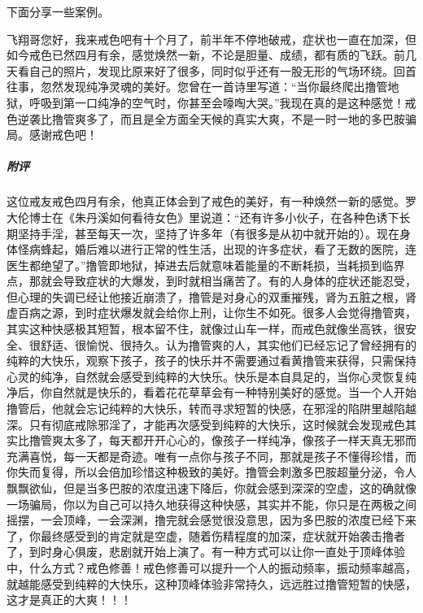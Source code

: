 下面分享一些案例。

\begin{case}
    飞翔哥您好，我来戒色吧有十个月了，前半年不停地破戒，症状也一直在加深，但如今戒色已然四月有余，感觉焕然一新，不论是胆量、成绩，都有质的飞跃。前几天看自己的照片，发现比原来好了很多，同时似乎还有一股无形的气场环绕。回首往事，忽然发现纯净灵魂的美好。您曾在一首诗里写道：“当你最终爬出撸管地狱，呼吸到第一口纯净的空气时，你甚至会嚎啕大哭。”我现在真的是这种感觉！戒色逆袭比撸管爽多了，而且是全方面全天候的真实大爽，不是一时一地的多巴胺骗局。感谢戒色吧！
    \subparagraph{附评} 这位戒友戒色四月有余，他真正体会到了戒色的美好，有一种焕然一新的感觉。罗大伦博士在《朱丹溪如何看待女色》里说道：“还有许多小伙子，在各种色诱下长期坚持手淫，甚至每天一次，坚持了许多年（有很多是从初中就开始的）。现在身体怪病蜂起，婚后难以进行正常的性生活，出现的许多症状，看了无数的医院，连医生都绝望了。”撸管即地狱，掉进去后就意味着能量的不断耗损，当耗损到临界点，那就会导致症状的大爆发，到时就相当痛苦了。有的人身体的症状还能忍受，但心理的失调已经让他接近崩溃了，撸管是对身心的双重摧残，肾为五脏之根，肾虚百病之源，到时症状爆发就会给你上刑，让你生不如死。很多人会觉得撸管爽，其实这种快感极其短暂，根本留不住，就像过山车一样，而戒色就像坐高铁，很安全、很舒适、很愉悦、很持久。认为撸管爽的人，其实他们已经忘记了曾经拥有的纯粹的大快乐，观察下孩子，孩子的快乐并不需要通过看黄撸管来获得，只需保持心灵的纯净，自然就会感受到纯粹的大快乐。快乐是本自具足的，当你心灵恢复纯净后，你自然就是快乐的，看着花花草草会有一种特别美好的感觉。当一个人开始撸管后，他就会忘记纯粹的大快乐，转而寻求短暂的快感，在邪淫的陷阱里越陷越深。只有彻底戒除邪淫了，才能再次感受到纯粹的大快乐，这时候就会发现戒色其实比撸管爽太多了，每天都开开心心的，像孩子一样纯净，像孩子一样天真无邪而充满喜悦，每一天都是奇迹。唯有一点你与孩子不同，那就是孩子不懂得珍惜，而你失而复得，所以会倍加珍惜这种极致的美好。撸管会刺激多巴胺超量分泌，令人飘飘欲仙，但是当多巴胺的浓度迅速下降后，你就会感到深深的空虚，这的确就像一场骗局，你以为自己可以持久地获得这种快感，其实并不能，你只是在两极之间摇摆，一会顶峰，一会深渊，撸完就会感觉很没意思，因为多巴胺的浓度已经下来了，你最终感受到的肯定就是空虚，随着伤精程度的加深，症状就开始袭击撸者了，到时身心俱废，悲剧就开始上演了。有一种方式可以让你一直处于顶峰体验中，什么方式？戒色修善！戒色修善可以提升一个人的振动频率，振动频率越高，就越能感受到纯粹的大快乐，这种顶峰体验非常持久，远远胜过撸管短暂的快感，这才是真正的大爽！！！
\end{case}

